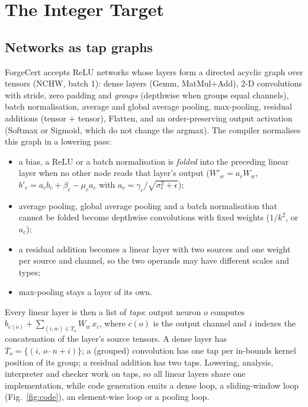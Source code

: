 
\section{The Integer Target}\label{sec:target}
\subsection{Networks as tap graphs}
ForgeCert accepts ReLU networks whose layers form a directed acyclic graph over tensors (NCHW, batch 1): dense layers (Gemm, MatMul+Add), 2-D convolutions with stride, zero padding and \emph{groups} (depthwise when groups equal channels), batch normalisation, average and global average pooling, max-pooling, residual additions (tensor + tensor), Flatten, and an order-preserving output activation (Softmax or Sigmoid, which do not change the argmax). The compiler normalises this graph in a lowering pass:
\begin{itemize}
\item a bias, a ReLU or a batch normalisation is \emph{folded} into the preceding linear layer when no other node reads that layer's output ($W'_w=a_cW_w$, $b'_c=a_cb_c+\beta_c-\mu_ca_c$ with $a_c=\gamma_c/\sqrt{\sigma^2_c+\epsilon}$);
\item average pooling, global average pooling and a batch normalisation that cannot be folded become depthwise convolutions with fixed weights ($1/k^2$, or $a_c$);
\item a residual addition becomes a linear layer with two sources and one weight per source and channel, so the two operands may have different scales and types;
\item max-pooling stays a layer of its own.
\end{itemize}
Every linear layer is then a list of \emph{taps}: output neuron $o$ computes $b_{c(o)}+\sum_{(i,w)\in T_o} W_w\,x_i$, where $c(o)$ is the output channel and $i$ indexes the concatenation of the layer's source tensors. A dense layer has $T_o=\{(i,\,o\cdot n+i)\}$; a (grouped) convolution has one tap per in-bounds kernel position of its group; a residual addition has two taps. Lowering, analysis, interpreter and checker work on taps, so all linear layers share one implementation, while code generation emits a dense loop, a sliding-window loop (Fig.~\ref{fig:code}), an element-wise loop or a pooling loop.

